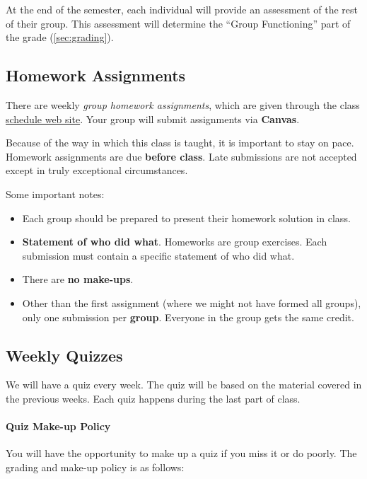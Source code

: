 \documentclass[11pt]{article}
\begin{document}
At the end of the semester, each individual will provide an assessment
of the rest of their group. This assessment will determine the ``Group Functioning'' part of the grade (\autoref{sec:grading}).

\subsection{Homework Assignments}\label{homework-assignments}

There are weekly \emph{group homework assignments}, which are given through the class \href{https://nguyenthanhvuh.github.io/class-oo/assignments}{schedule web site}. Your group will submit assignments via \textbf{Canvas}.

Because of the way in which this class is taught, it is important to
stay on pace. Homework assignments are due \textbf{before class}. Late submissions
are not accepted except in truly exceptional circumstances.

Some important notes:

\begin{itemize}
\item
Each group should be prepared to present their homework solution in
class.

\item
  \textbf{Statement of who did what}. Homeworks are group exercises.
  Each submission must contain a specific statement of who did what.
\item
  There are \textbf{no make-ups}.
\item
  Other than the first assignment (where we might not have formed all
  groups), only one submission per \textbf{\textbf{group}}. Everyone in
  the group gets the same credit.
\end{itemize}

\subsection{Weekly Quizzes}\label{weekly-quizzes}

We will have a quiz every week. The quiz will be based on the material covered in the previous weeks. Each quiz happens during the last part of class.


\paragraph{Quiz Make-up Policy} You will have the opportunity to make up a quiz if you miss it or do poorly. The grading and make-up policy is as follows:
\end{document}
